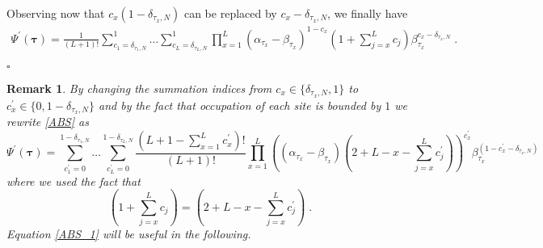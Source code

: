 \documentclass[10pt]{article}
\numberwithin{equation}{section}
\numberwithin{equation}{subsection}
\newtheorem{remark}{Remark}
\newcommand{\dt}{\;.}
\begin{document}
Observing now that $c_{x}(1-\delta_{\tau_{x},N})$ can be replaced by  $c_{x}-\delta_{\tau_{x},N}$, we finally have
\begin{equation}\label{elementsABS}
	\begin{split}
		\Psi^{'}(\bm{\tau})=\frac{1}{(L+1)!}\sum_{c_{1}=\delta_{\tau_{1},N}}^{1}\ldots\sum_{c_{L}=\delta_{\tau_{L},N}}^{1}\prod_{x=1}^{L}(\alpha_{\tau_{x}}-\beta_{\tau_{x}})^{1-c_{x}}\left(1+\sum_{j=x}^{L}c_{j}\right)\beta_{\tau_{x}}^{c_{x}-\delta_{\tau_{x},N}}\dt
	\end{split}
\end{equation} 
\begin{flushright}
    $\square$
\end{flushright}
\begin{remark} By changing the summation indices from $c_x\in \{\delta_{\tau_{x},N},1\}$ to $c_{x}^{'}\in \{0,1-\delta_{\tau_{x},N}\}$ and by  the fact that occupation of each site is bounded by $1$ we rewrite \eqref{ABS} as 
\begin{equation}\label{ABS_1}
	\Psi^{'}(\bm{\tau})=\sum_{c^{'}_{1}=0}^{1-\delta_{\tau_{1},N}}\ldots\sum_{c^{'}_{L}=0}^{1-\delta_{\tau_{L},N}}\frac{(L+1-\sum_{x=1}^{L}c^{'}_{x})!}{(L+1)!}\prod_{x=1}^{L}\left((\alpha_{\tau_{x}}-\beta_{\tau_{x}})\left(2+L-x-\sum_{j=x}^{L}c^{'}_{j}\right)\right)^{c^{'}_{x}}\beta_{\tau_{x}}^{(1-c^{'}_{x}-\delta_{\tau_{x},N})}
\end{equation}
where we used the fact that 
\begin{equation}
	\left(1+\sum_{j=x}^{L}c_{j}\right) =\left(2+L-x-\sum_{j=x}^{L}c^{'}_{j}\right)\dt
\end{equation}
Equation \eqref{ABS_1} will be useful in the following. 
\end{remark}
\end{document}
